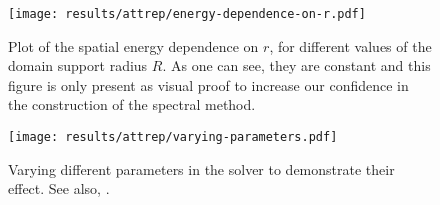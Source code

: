 \begin{figure}[H]
  \centering
  \label{fig:spatial-energy-dependence}
  \texttt{[image: results/attrep/energy-dependence-on-r.pdf]}
  \caption[Spatial energy dependence on $r$]{Plot of the spatial energy dependence on $r$, for different values of the domain support radius $R$. As one can see, they are constant and this figure is only present as visual proof to increase our confidence in the construction of the spectral method.}
\end{figure}

\begin{figure}[H]
  \centering
  \label{fig:varying-parameters}
  \texttt{[image: results/attrep/varying-parameters.pdf]}
  \caption[Varying parameters in the solver]{
    Varying different parameters in the solver to demonstrate their effect.
    See also, .
  }
\end{figure}
